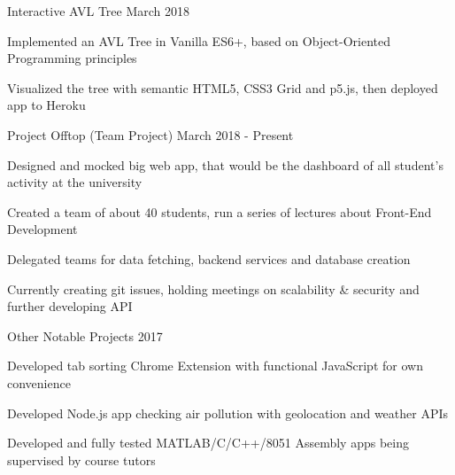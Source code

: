 \begin{cventries}
\cventryproject
  {Interactive AVL Tree} %
  {March 2018} %
  {
    \begin{cvitems} %
      \item Implemented an AVL Tree in Vanilla ES6+, based on Object-Oriented Programming principles
      \item Visualized the tree with semantic HTML5, CSS3 Grid and p5.js, then deployed app to Heroku
  \end{cvitems}
  }

\cventryproject
{Project Offtop (Team Project)} %
{March 2018 - Present} %
  {
    \begin{cvitems} %
      \item Designed and mocked big web app, that would be the dashboard of all student's activity at the university
      \item Created a team of about 40 students, run a series of lectures about Front-End Development
       \item Delegated teams for data fetching, backend services and database creation
      \item Currently creating git issues, holding meetings on scalability \& security and further developing API
      \end{cvitems}
  }

\cventryproject
{Other Notable Projects} %
{2017} %
  {
    \begin{cvitems} %
      \item Developed tab sorting Chrome Extension with functional JavaScript for own convenience
      \item Developed Node.js app checking air pollution with geolocation and weather APIs
      \item Developed and fully tested MATLAB/C/C++/8051 Assembly apps being supervised by course tutors
  \end{cvitems}
  }

\end{cventries}
